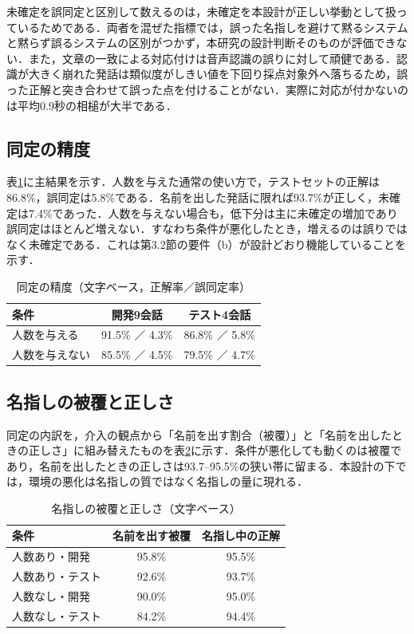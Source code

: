 \documentclass[a4paper]{ltjsarticle}
\begin{document}
未確定を誤同定と区別して数えるのは，未確定を本設計が正しい挙動として扱っているためである．両者を混ぜた指標では，誤った名指しを避けて黙るシステムと黙らず誤るシステムの区別がつかず，本研究の設計判断そのものが評価できない．また，文章の一致による対応付けは音声認識の誤りに対して頑健である．認識が大きく崩れた発話は類似度がしきい値を下回り採点対象外へ落ちるため，誤った正解と突き合わせて誤った点を付けることがない．実際に対応が付かないのは平均0.9秒の相槌が大半である．

\subsection{同定の精度}
表\ref{tab:main}に主結果を示す．人数を与えた通常の使い方で，テストセットの正解は86.8\%，誤同定は5.8\%である．名前を出した発話に限れば93.7\%が正しく，未確定は7.4\%であった．人数を与えない場合も，低下分は主に未確定の増加であり誤同定はほとんど増えない．すなわち条件が悪化したとき，増えるのは誤りではなく未確定である．これは第3.2節の要件（b）が設計どおり機能していることを示す．

\begin{table}[tb]
\centering
\caption{同定の精度（文字ベース，正解率／誤同定率）}
\label{tab:main}
\small
\begin{tabular}{lcc}
\toprule
条件 & 開発9会話 & テスト4会話 \\
\midrule
人数を与える & 91.5\% ／ 4.3\% & 86.8\% ／ 5.8\% \\
人数を与えない & 85.5\% ／ 4.5\% & 79.5\% ／ 4.7\% \\
\bottomrule
\end{tabular}
\end{table}

\subsection{名指しの被覆と正しさ}
同定の内訳を，介入の観点から「名前を出す割合（被覆）」と「名前を出したときの正しさ」に組み替えたものを表\ref{tab:risk}に示す．条件が悪化しても動くのは被覆であり，名前を出したときの正しさは93.7--95.5\%の狭い帯に留まる．本設計の下では，環境の悪化は名指しの質ではなく名指しの量に現れる．

\begin{table}[tb]
\centering
\caption{名指しの被覆と正しさ（文字ベース）}
\label{tab:risk}
\small
\begin{tabular}{lcc}
\toprule
条件 & 名前を出す被覆 & 名指し中の正解 \\
\midrule
人数あり・開発 & 95.8\% & 95.5\% \\
人数あり・テスト & 92.6\% & 93.7\% \\
人数なし・開発 & 90.0\% & 95.0\% \\
人数なし・テスト & 84.2\% & 94.4\% \\
\bottomrule
\end{tabular}
\end{table}
\end{document}
